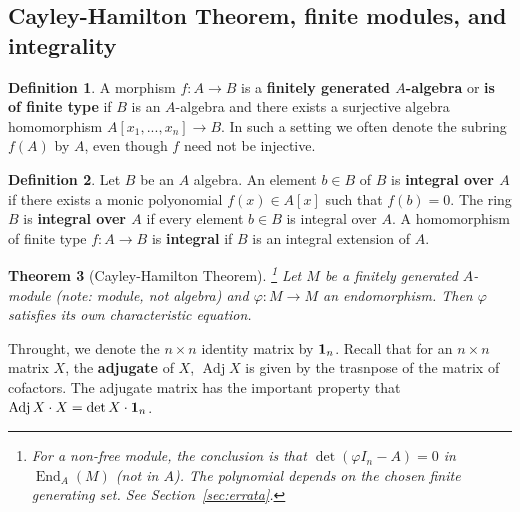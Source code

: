 \documentclass[12pt]{article}
\theoremstyle{plain}
\newtheorem{thm}{Theorem}[subsection] %
\theoremstyle{definition}
\newtheorem{defn}[thm]{Definition} %
\begin{document}
\subsection{Cayley-Hamilton Theorem, finite modules, and integrality}
\begin{defn}
A morphism $f:A \to B$ is a \textbf{finitely generated $A$-algebra} or \textbf{is of finite type} if $B$ is an $A$-algebra and there exists a surjective algebra homomorphism $A[x_1,...,x_n] \to B$. In such a setting we often denote the subring $f(A)$ by $A$, even though $f$ need not be injective.
\end{defn}
\begin{defn}
Let $B$ be an $A$ algebra. An element $b\in B$ of $B$ is \textbf{integral over $A$} if there exists a monic polyonomial $f(x) \in A[x]$ such that $f(b) = 0$. The ring $B$ is \textbf{integral over $A$} if every element $b \in B$ is integral over $A$. A homomorphism of finite type $f: A \to B$ is \textbf{integral} if $B$ is an integral extension of $A$.
\end{defn}
\begin{thm}[Cayley-Hamilton Theorem]\label{thm:cayley_hamilton}\footnote{For a non-free module, the conclusion is that $\det(\varphi I_n - A)=0$ in $\operatorname{End}_A(M)$ (not in $A$). The polynomial depends on the chosen finite generating set. See Section~\ref{sec:errata}.}
Let $M$ be a finitely generated $A$-module (note: module, not algebra) and $\varphi: M \to M$ an endomorphism. Then $\varphi$ satisfies its own characteristic equation.
\end{thm}
Throught, we denote the $n\times n$ identity matrix by $\bold{1}_n$. Recall that for an $n \times n$ matrix $X$, the \textbf{adjugate} of $X$, $\operatorname{Adj}X$ is given by the trasnpose of the matrix of cofactors. The adjugate matrix has the important property that $\operatorname{Adj}X\cdot X = \operatorname{det}X\cdot \bold{1}_n$.
\end{document}
